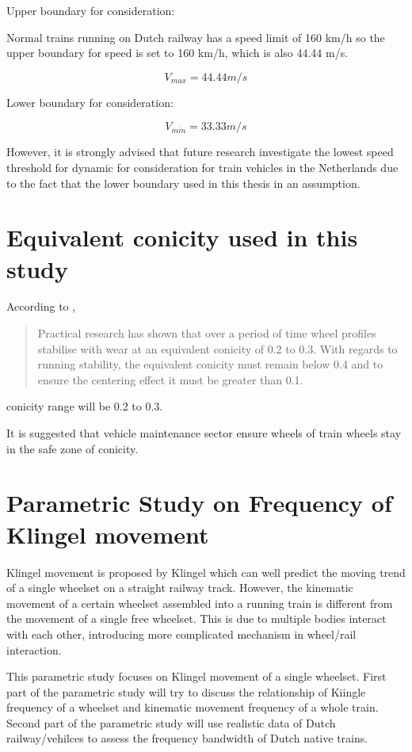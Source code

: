 Upper boundary for consideration:

Normal trains running on Dutch railway has a speed limit of 160 km/h so the upper boundary for speed is set to 160 km/h, which is also 44.44 m/s. 

$$ V_{max} = 44.44m/s $$

Lower boundary for consideration:

$$ V_{min} = 33.33m/s $$

However, it is strongly advised that future research investigate the lowest speed threshold for dynamic for consideration for train vehicles in the Netherlands due to the fact that the lower boundary used in this thesis in an assumption.

\section{Equivalent conicity used in this study}
According to \cite[Section.2.6]{esveld2001modern}, 

\begin{quote}
    Practical research has shown that over a period of time wheel profiles stabilise with wear at an equivalent conicity of 0.2 to 0.3. With regards to running stability, the equivalent conicity must remain below 0.4 and to ensure the centering effect it must be greater than 0.1.
\end{quote}

conicity range will be 0.2 to 0.3.

It is suggested that vehicle maintenance sector ensure wheels of train wheels stay in the safe zone of conicity. 


\section{Parametric Study on Frequency of Klingel movement}

Klingel movement is proposed by Klingel which can well predict the moving trend of a single wheelset on a straight railway track. However, the kinematic movement of a certain wheelset assembled into a running train is different from the movement of a single free wheelset. This is due to multiple bodies interact with each other, introducing more complicated mechanism in wheel/rail interaction. 

This parametric study focuses on Klingel movement of a single wheelset. First part of the parametric study will try to discuss the relationship of Kiingle frequency of a wheelset and kinematic movement frequency of a whole train. Second part of the parametric study will use realistic data of Dutch railway/vehilces to assess the frequency bandwidth of Dutch native trains.

